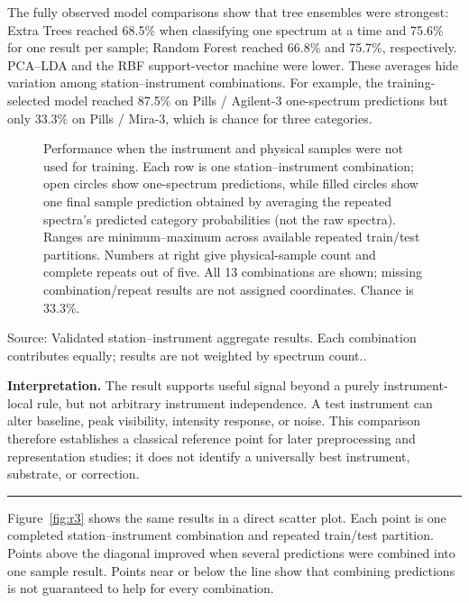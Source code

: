 \documentclass[10pt]{article}
\newcommand{\source}[1]{{\scriptsize Source: #1.}}
\newcommand{\sectiontitle}[1]{\vspace{2pt}{\large\bfseries #1}\par\vspace{1pt}\hrule\vspace{3pt}}
\begin{document}
The fully observed model comparisons show that tree ensembles were strongest: Extra Trees reached 68.5\% when classifying one spectrum at a time and 75.6\% for one result per sample; Random Forest reached 66.8\% and 75.7\%, respectively. PCA--LDA and the RBF support-vector machine were lower. These averages hide variation among station--instrument combinations. For example, the training-selected model reached 87.5\% on Pills / Agilent-3 one-spectrum predictions but only 33.3\% on Pills / Mira-3, which is chance for three categories.

\begin{figure}[H]
\centering

\caption{\label{fig:r2}Performance when the instrument and physical samples were not used for training. Each row is one station--instrument combination; open circles show one-spectrum predictions, while filled circles show one final sample prediction obtained by averaging the repeated spectra's predicted category probabilities (not the raw spectra). Ranges are minimum--maximum across available repeated train/test partitions. Numbers at right give physical-sample count and complete repeats out of five. All 13 combinations are shown; missing combination/repeat results are not assigned coordinates. Chance is 33.3\%.}
\end{figure}
\source{Validated station--instrument aggregate results. Each combination contributes equally; results are not weighted by spectrum count.}

\textbf{Interpretation.} The result supports useful signal beyond a purely instrument-local rule, but not arbitrary instrument independence. A test instrument can alter baseline, peak visibility, intensity response, or noise. This comparison therefore establishes a classical reference point for later preprocessing and representation studies; it does not identify a universally best instrument, substrate, or correction.

\newpage
\sectiontitle{4. Why repeated measurements help}
Figure~\ref{fig:r3} shows the same results in a direct scatter plot. Each point is one completed station--instrument combination and repeated train/test partition. Points above the diagonal improved when several predictions were combined into one sample result. Points near or below the line show that combining predictions is not guaranteed to help for every combination.
\end{document}
